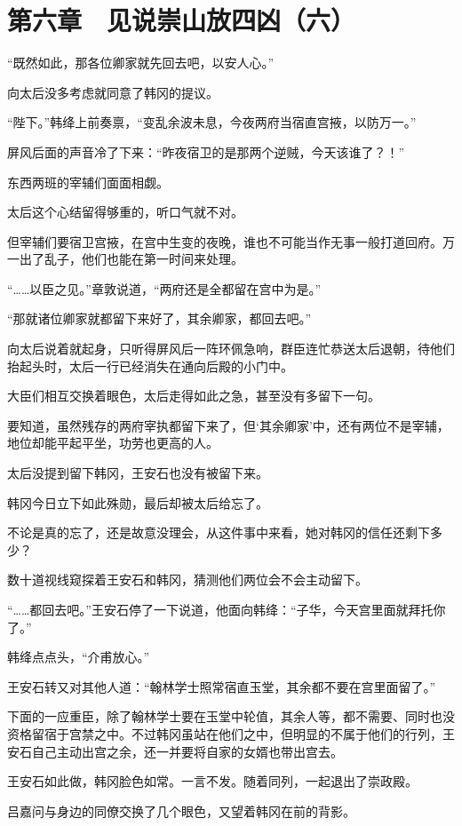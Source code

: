 \section{第六章　见说崇山放四凶（六）}

“既然如此，那各位卿家就先回去吧，以安人心。”

向太后没多考虑就同意了韩冈的提议。

“陛下。”韩绛上前奏禀，“变乱余波未息，今夜两府当宿直宫掖，以防万一。”

屏风后面的声音冷了下来：“昨夜宿卫的是那两个逆贼，今天该谁了？！”

东西两班的宰辅们面面相觑。

太后这个心结留得够重的，听口气就不对。

但宰辅们要宿卫宫掖，在宫中生变的夜晚，谁也不可能当作无事一般打道回府。万一出了乱子，他们也能在第一时间来处理。

“……以臣之见。”章敦说道，“两府还是全都留在宫中为是。”

“那就诸位卿家就都留下来好了，其余卿家，都回去吧。”

向太后说着就起身，只听得屏风后一阵环佩急响，群臣连忙恭送太后退朝，待他们抬起头时，太后一行已经消失在通向后殿的小门中。

大臣们相互交换着眼色，太后走得如此之急，甚至没有多留下一句。

要知道，虽然残存的两府宰执都留下来了，但‘其余卿家’中，还有两位不是宰辅，地位却能平起平坐，功劳也更高的人。

太后没提到留下韩冈，王安石也没有被留下来。

韩冈今日立下如此殊勋，最后却被太后给忘了。

不论是真的忘了，还是故意没理会，从这件事中来看，她对韩冈的信任还剩下多少？

数十道视线窥探着王安石和韩冈，猜测他们两位会不会主动留下。

“……都回去吧。”王安石停了一下说道，他面向韩绛：“子华，今天宫里面就拜托你了。”

韩绛点点头，“介甫放心。”

王安石转又对其他人道：“翰林学士照常宿直玉堂，其余都不要在宫里面留了。”

下面的一应重臣，除了翰林学士要在玉堂中轮值，其余人等，都不需要、同时也没资格留宿于宫禁之中。不过韩冈虽站在他们之中，但明显的不属于他们的行列，王安石自己主动出宫之余，还一并要将自家的女婿也带出宫去。

王安石如此做，韩冈脸色如常。一言不发。随着同列，一起退出了崇政殿。

吕嘉问与身边的同僚交换了几个眼色，又望着韩冈在前的背影。

